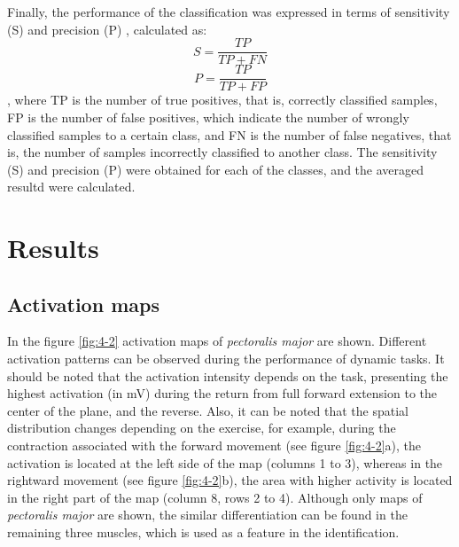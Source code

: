 Finally, the performance of the classification was expressed in terms of sensitivity (S) and precision (P) \citep{Farina2001}, calculated as:
\begin{equation}
S = \frac{TP}{TP+FN}
\end{equation}
\begin{equation}
P = \frac{TP}{TP+FP}
\end{equation}
, where TP is the number of true positives, that is, correctly classified samples, FP is the number of false positives, which indicate the number of wrongly classified samples to a certain class, and FN is the number of false negatives, that is, the number of samples incorrectly classified to another class. The sensitivity (S) and precision (P) were obtained for each of the classes, and the averaged resultd were calculated.


\section{Results}
\subsection{Activation maps}
In the figure \ref{fig:4-2} activation maps of \textit{pectoralis major} are shown. Different activation patterns can be observed during the performance of dynamic tasks. It should be noted that the activation intensity depends on the task, presenting the highest activation (in mV) during the return from full forward extension to the center of the plane, and the reverse. Also, it can be noted that the spatial distribution changes depending on the exercise, for example, during the contraction associated with the forward movement (see figure \ref{fig:4-2}a), the activation is located at the left side of the map (columns 1 to 3), whereas in the rightward movement (see figure \ref{fig:4-2}b), the area with higher activity is located in the right part of the map (column 8, rows 2 to 4). Although only maps of \textit{pectoralis major} are shown, the similar differentiation can be found in the remaining three muscles, which is used as a feature in the identification. 

